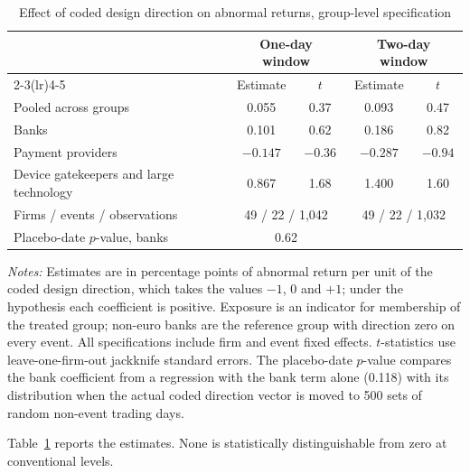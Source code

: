 \documentclass[11pt]{article}
\theoremstyle{plain}\newtheorem{proposition}{Proposition}
\begin{document}
\begin{table}[t]\centering\small
\begin{threeparttable}
\caption{Effect of coded design direction on abnormal returns, group-level specification}\label{tab:main}
\begin{tabular}{lcccc}
\toprule
& \multicolumn{2}{c}{One-day window} & \multicolumn{2}{c}{Two-day window} \\
\cmidrule(lr){2-3}\cmidrule(lr){4-5}
& Estimate & $t$ & Estimate & $t$ \\
\midrule
Pooled across groups & 0.055 & 0.37 & 0.093 & 0.47 \\[2pt]
Banks & 0.101 & 0.62 & 0.186 & 0.82 \\
Payment providers & $-0.147$ & $-0.36$ & $-0.287$ & $-0.94$ \\
Device gatekeepers and large technology & 0.867 & 1.68 & 1.400 & 1.60 \\
\midrule
Firms / events / observations & \multicolumn{2}{c}{49 / 22 / 1,042} & \multicolumn{2}{c}{49 / 22 / 1,032} \\
Placebo-date $p$-value, banks & \multicolumn{2}{c}{0.62} & & \\
\bottomrule
\end{tabular}
\begin{tablenotes}\footnotesize
\item \textit{Notes:} Estimates are in percentage points of abnormal return per unit of the coded design direction, which takes the values $-1$, $0$ and $+1$; under the hypothesis each coefficient is positive. Exposure is an indicator for membership of the treated group; non-euro banks are the reference group with direction zero on every event. All specifications include firm and event fixed effects. $t$-statistics use leave-one-firm-out jackknife standard errors. The placebo-date $p$-value compares the bank coefficient from a regression with the bank term alone (0.118) with its distribution when the actual coded direction vector is moved to 500 sets of random non-event trading days.
\end{tablenotes}
\end{threeparttable}
\end{table}

Table~\ref{tab:main} reports the estimates. None is statistically distinguishable from zero at conventional levels.
\end{document}

